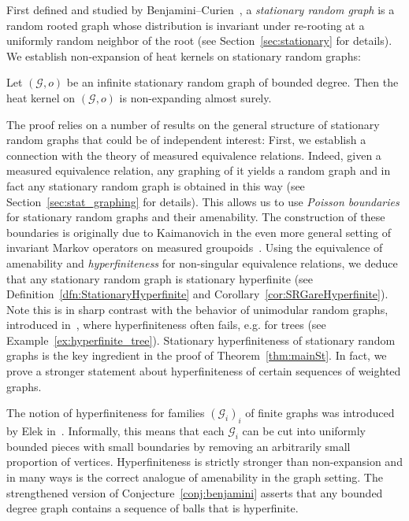 \documentclass[AHL,Unicode,longabstracts,published]{cedram}
\newcommand{\calG}{\mathcal{G}}
\begin{document}
First defined and studied by Benjamini--Curien~\cite{BenCur}, a \emph{stationary random graph} is a random rooted graph whose distribution is invariant under re-rooting at a uniformly random neighbor of the root (see Section~\ref{sec:stationary} for details). We establish non-expansion of heat kernels on stationary random graphs:

\begin{theo}\label{thm:mainSt}
Let $(\calG,o)$ be an infinite stationary random graph of bounded degree. Then the heat kernel on $(\calG,o)$ is non-expanding almost surely.
\end{theo}

The proof relies on a number of results on the general structure of stationary random graphs that could be of independent interest: First, we establish a connection with the theory of measured equivalence relations. Indeed, given a measured equivalence relation, any graphing of it yields a random graph and in fact any stationary random graph is obtained in this way (see Section~\ref{sec:stat_graphing} for details). This allows us to use \emph{Poisson boundaries} for stationary random graphs and their amenability. The construction of these boundaries is originally due to Kaimanovich in the even more general setting of invariant Markov operators on measured groupoids~\cite{Kai05}. Using the equivalence of amenability and \emph{hyperfiniteness} for non-singular equivalence relations, we deduce that any stationary random graph is stationary hyperfinite (see Definition~\ref{dfn:StationaryHyperfinite} and Corollary~\ref{cor:SRGareHyperfinite}). Note this is in sharp contrast with the behavior of unimodular random graphs, introduced in~\cite{ALR2007}, where hyperfiniteness often fails, e.g. for trees (see Example~\ref{ex:hyperfinite_tree}). Stationary hyperfiniteness of stationary random graphs is the key ingredient in the proof of Theorem~\ref{thm:mainSt}. In fact, we prove a stronger statement about hyperfiniteness of certain sequences of weighted graphs.

The notion of hyperfiniteness for families $(\calG_i)_i$ of finite graphs was introduced by Elek in~\cite{Elek2006}. Informally, this means that each $\calG_i$ can be cut into uniformly bounded pieces with small boundaries by removing an arbitrarily small proportion of vertices. Hyperfiniteness is strictly stronger than non-expansion and in many ways is the correct analogue of amenability in the graph setting. The strengthened version of Conjecture~\ref{conj:benjamini} asserts that any bounded degree graph contains a sequence of balls that is hyperfinite.
\end{document}
